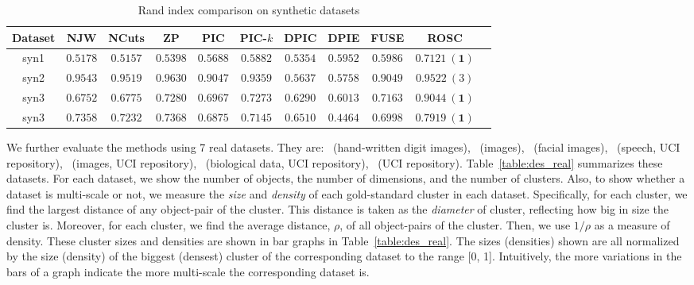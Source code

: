 {\begin{table}[!htbp]
\centering
\caption{Rand index comparison on synthetic datasets}
\label{table:ri_synthetic}
\resizebox{0.8\linewidth}{!}
{
\begin{tabular}{|c|c|c|c|c|c|c|c|c|c|c|} \hline
Dataset &NJW & NCuts & ZP & PIC & PIC-$k$ & DPIC & DPIE & FUSE & ROSC \\ \hline 
syn1 & $0.5178$ & $0.5157$ & $0.5398$ & $0.5688$ & $0.5882$ & $0.5354$ & $0.5952$ & $0.5986$ & $\bm{0.7121\ (1)}$ \\ \hline
syn2 & $0.9543$ & $0.9519$ & $\bm{0.9630}$ & $0.9047$ & $0.9359$ & $0.5637$ & $0.5758$ & $0.9049$ & $0.9522\ (3)$ \\ \hline
syn3 & $0.6752$ & $0.6775$ & $0.7280$ & $0.6967$ & $0.7273$ & $0.6290$ & $0.6013$ & $0.7163$ & $\bm{0.9044\ (1)}$ \\ \hline
syn3 & $0.7358$ & $0.7232$ & $0.7368$ & $0.6875$ & $0.7145$ & $0.6510$ & $0.4464$ & $0.6998$ & $\bm{0.7919\ (1)}$ \\ \hline
\end{tabular}
}
\end{table}
}

We further evaluate the methods using 7 real datasets.
They are:
\mnist\ (hand-written digit images),
\coil\ (images),
\yale\ (facial images),
\isolet\ (speech, UCI repository),
\seg\ (images, UCI repository),
\yeast\ (biological data, UCI repository),
\glass\ (UCI repository).
Table~\ref{table:des_real} summarizes these datasets.
For each dataset, we show the number of objects, the number of dimensions, and the number of clusters.
Also, to show whether a dataset is multi-scale or not, we measure the {\it size} and {\it density} of each
gold-standard cluster in each dataset. 
Specifically, for each cluster, we find the largest distance of any object-pair of the cluster. 
This distance is taken as the {\it diameter} of cluster, reflecting how big in size the cluster is.
Moreover, for each cluster, we find the average distance, $\rho$, of all object-pairs of the cluster. 
Then, we use $1/\rho$ as a measure of density. These cluster sizes and densities are shown in
bar graphs in Table~\ref{table:des_real}.
The sizes (densities) shown are all normalized by the size (density) of the biggest (densest) cluster
of the corresponding dataset to the range [0, 1].
Intuitively, the more variations in the bars of a graph indicate the more multi-scale the corresponding
dataset is.
 
